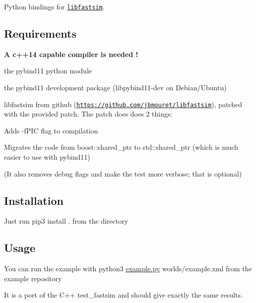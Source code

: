Python bindings for \href{https://github.com/jbmouret/libfastsim}{\tt libfastsim}.

\subsection*{Requirements }


\begin{DoxyItemize}
\item {\bfseries A c++14 capable compiler is needed !}
\item the pybind11 python module
\item the pybind11 development package (libpybind11-\/dev on Debian/\+Ubuntu)
\item libfastsim from github (\href{https://github.com/jbmouret/libfastsim}{\tt https\+://github.\+com/jbmouret/libfastsim}), patched with the provided patch. The patch does does 2 things\+:
\begin{DoxyItemize}
\item Adds -\/f\+P\+IC flag to compilation
\item Migrates the code from boost\+::shared\+\_\+ptr to std\+::shared\+\_\+ptr (which is much easier to use with pybind11)
\item (It also removes debug flags and make the test more verbose; that is optional)
\end{DoxyItemize}
\end{DoxyItemize}

\subsection*{Installation }


\begin{DoxyItemize}
\item Just run {\ttfamily pip3 install .} from the directory
\end{DoxyItemize}

\subsection*{Usage }

You can run the example with {\ttfamily python3 \hyperlink{example_8py}{example.\+py} worlds/example.\+xml} from the example repository

It is a port of the C++ test\+\_\+fastsim and should give exactly the same results. 